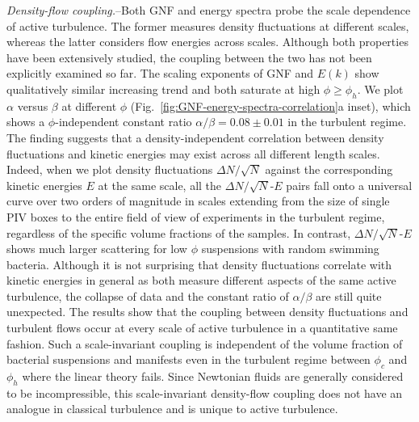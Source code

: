 \documentclass[twocolumn,aps,prl,amsmath,amssymb,longbibliography]{revtex4-2}
\begin{document}
\textit{Density-flow coupling.}--Both GNF and energy spectra probe the scale dependence of active turbulence. The former measures density fluctuations at different scales, whereas the latter considers flow energies across scales. Although both properties have been extensively studied, the coupling between the two has not been explicitly examined so far. The scaling exponents of GNF and $E(k)$ show qualitatively similar increasing trend and both saturate at high $\phi \geq \phi_h$. We plot $\alpha$ versus $\beta$ at different $\phi$ (Fig.~\ref{fig:GNF-energy-spectra-correlation}a inset), which shows a $\phi$-independent constant ratio $\alpha/\beta = 0.08 \pm 0.01$ in the turbulent regime. The finding suggests that a density-independent correlation between density fluctuations and kinetic energies may exist across all different length scales.
Indeed, when we plot density fluctuations $\Delta N/\sqrt N$ against the corresponding kinetic energies $E$ at the same scale, all the $\Delta N/\sqrt N$-$E$ pairs fall onto a universal curve over two orders of magnitude in scales extending from the size of single PIV boxes to the entire field of view of experiments in the turbulent regime, regardless of the specific volume fractions of the samples. In contrast, $\Delta N/\sqrt N$-$E$ shows much larger scattering for low $\phi$ suspensions with random swimming bacteria.
Although it is not surprising that density fluctuations correlate with kinetic energies in general as both measure different aspects of the same active turbulence, the collapse of data and the constant ratio of $\alpha/\beta$ are still quite unexpected. The results show that the coupling between density fluctuations and turbulent flows occur at every scale of active turbulence in a quantitative same fashion. Such a scale-invariant coupling is independent of the volume fraction of bacterial suspensions and manifests even in the turbulent regime between $\phi_c$ and $\phi_h$ where the linear theory fails. Since Newtonian fluids are generally considered to be incompressible, this scale-invariant density-flow coupling does not have an analogue in classical turbulence and is unique to active turbulence.
\end{document}
